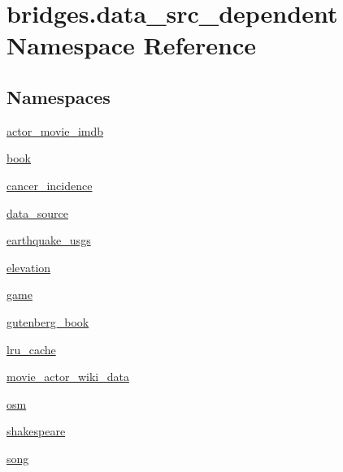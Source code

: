 \hypertarget{namespacebridges_1_1data__src__dependent}{}\section{bridges.\+data\+\_\+src\+\_\+dependent Namespace Reference}
\label{namespacebridges_1_1data__src__dependent}
\subsection*{Namespaces}
\begin{DoxyCompactItemize}
\item 
 \hyperlink{namespacebridges_1_1data__src__dependent_1_1actor__movie__imdb}{actor\+\_\+movie\+\_\+imdb}
\item 
 \hyperlink{namespacebridges_1_1data__src__dependent_1_1book}{book}
\item 
 \hyperlink{namespacebridges_1_1data__src__dependent_1_1cancer__incidence}{cancer\+\_\+incidence}
\item 
 \hyperlink{namespacebridges_1_1data__src__dependent_1_1data__source}{data\+\_\+source}
\item 
 \hyperlink{namespacebridges_1_1data__src__dependent_1_1earthquake__usgs}{earthquake\+\_\+usgs}
\item 
 \hyperlink{namespacebridges_1_1data__src__dependent_1_1elevation}{elevation}
\item 
 \hyperlink{namespacebridges_1_1data__src__dependent_1_1game}{game}
\item 
 \hyperlink{namespacebridges_1_1data__src__dependent_1_1gutenberg__book}{gutenberg\+\_\+book}
\item 
 \hyperlink{namespacebridges_1_1data__src__dependent_1_1lru__cache}{lru\+\_\+cache}
\item 
 \hyperlink{namespacebridges_1_1data__src__dependent_1_1movie__actor__wiki__data}{movie\+\_\+actor\+\_\+wiki\+\_\+data}
\item 
 \hyperlink{namespacebridges_1_1data__src__dependent_1_1osm}{osm}
\item 
 \hyperlink{namespacebridges_1_1data__src__dependent_1_1shakespeare}{shakespeare}
\item 
 \hyperlink{namespacebridges_1_1data__src__dependent_1_1song}{song}
\end{DoxyCompactItemize}
